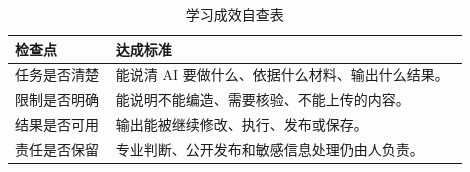 \begin{table}[H]
\centering
\caption{学习成效自查表}
\label{tab:learning-self-check}
\begin{tabular}{p{0.20\linewidth} p{0.70\linewidth}}
\toprule
\textbf{检查点} & \textbf{达成标准} \\
\midrule
任务是否清楚 & 能说清 AI 要做什么、依据什么材料、输出什么结果。 \\
限制是否明确 & 能说明不能编造、需要核验、不能上传的内容。 \\
结果是否可用 & 输出能被继续修改、执行、发布或保存。 \\
责任是否保留 & 专业判断、公开发布和敏感信息处理仍由人负责。 \\
\bottomrule
\end{tabular}
\end{table}


